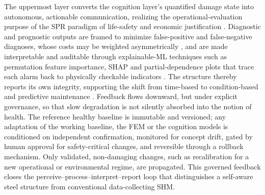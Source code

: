 The uppermost layer converts the cognition layer's quantified damage state into autonomous, actionable communication, realizing the operational-evaluation purpose of the SPR paradigm of life-safety and economic justification \citep{farrar2013shm}. Diagnostic and prognostic outputs are framed to minimize false-positive and false-negative diagnoses, whose costs may be weighted asymmetrically \citep{farrar2013shm}, and are made interpretable and auditable through explainable-ML techniques such as permutation feature importance, SHAP and partial-dependence plots that trace each alarm back to physically checkable indicators \citep{naser2023ml}. The structure thereby reports its own integrity, supporting the shift from time-based to condition-based and predictive maintenance \citep{farrar2013shm,mariniello2025enhancing}. Feedback flows downward, but under explicit governance, so that slow degradation is not silently absorbed into the notion of health. The reference healthy baseline is immutable and versioned; any adaptation of the working baseline, the FEM or the cognition models is conditioned on independent confirmation, monitored for concept drift, gated by human approval for safety-critical changes, and reversible through a rollback mechanism. Only validated, non-damaging changes, such as recalibration for a new operational or environmental regime, are propagated. This governed feedback closes the perceive--process--interpret--report loop that distinguishes a self-aware steel structure from conventional data-collecting SHM.

